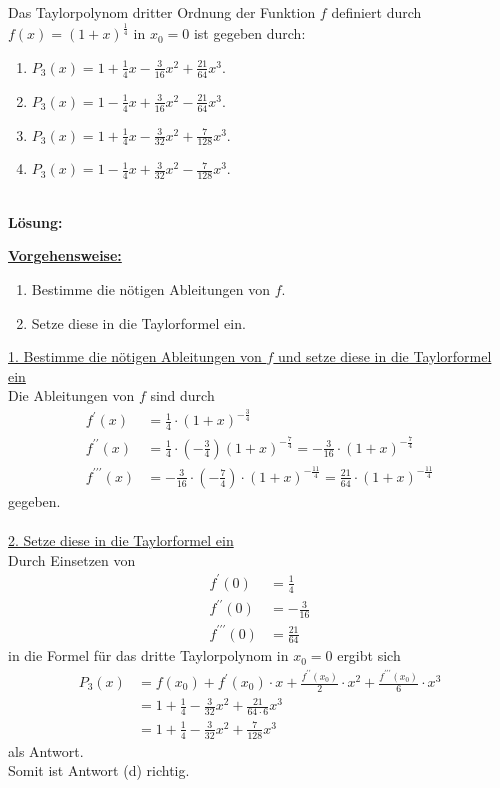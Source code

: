 \subsection*{}
Das Taylorpolynom dritter Ordnung der Funktion $f$ definiert durch 
$f(x) = (1+x)^{\frac{1}{4}}$ in $x_0 = 0$ ist gegeben durch:
\begin{enumerate}
\item $P_3(x) = 1 + \frac{1}{4} x - \frac{3}{16}x^2 +\frac{21}{64}x^3$.
\item $P_3(x) = 1 -\frac{1}{4} x + \frac{3}{16}x^2 - \frac{21}{64}x^3$.
\item $P_3(x) = 1 +\frac{1}{4} x - \frac{3}{32}x^2 + \frac{7}{128}x^3$.
\item $P_3(x) = 1 -\frac{1}{4} x + \frac{3}{32}x^2 - \frac{7}{128}x^3$.
\end{enumerate}
\ \\
\textbf{Lösung:}
\begin{mdframed}
\underline{\textbf{Vorgehensweise:}}
\renewcommand{\labelenumi}{\theenumi.}
\begin{enumerate}
\item Bestimme die nötigen Ableitungen von $f$.
\item Setze diese in die Taylorformel ein.
\end{enumerate}
\end{mdframed}

\underline{1. Bestimme die nötigen Ableitungen von $f$ und setze diese in die Taylorformel ein}\\
Die Ableitungen von $f$ sind durch
\begin{align*}
f^\prime(x) &= \frac{1}{4} \cdot (1 +x )^{-\frac{3}{4}}\\
f^{\prime \prime}(x) &=
\frac{1}{4} \cdot \left( - \frac{3}{4} \right) (1+x)^{-\frac{7}{4}} 
= - \frac{3}{16} \cdot (1+x)^{-\frac{7}{4}}\\
f^{\prime \prime \prime}(x) 
&= -\frac{3}{16} \cdot \left(- \frac{7}{4} \right)
\cdot (1+x)^{-\frac{11}{4}}
=\frac{21}{64} \cdot (1+x)^{-\frac{11}{4}}
\end{align*}
gegeben. 
\\
\\

\underline{2. Setze diese in die Taylorformel ein}\\	
Durch Einsetzen von 
\begin{align*}
f^\prime(0) &= \frac{1}{4}\\
f^{\prime \prime}(0) &= - \frac{3}{16}\\
f^{\prime \prime \prime}(0 ) &=\frac{21}{64}
\end{align*}
in die Formel für das dritte Taylorpolynom in $x_0 = 0$ ergibt sich
\begin{align*}
P_3(x) 
&= f(x_0) + f^\prime(x_0)\cdot x + \frac{f^{\prime \prime}(x_0)}{2}\cdot x^2+
\frac{f^{\prime \prime \prime}(x_0)}{6} \cdot x^3 \\
&=1 + \frac{1}{4} - \frac{3}{32} x^2+ \frac{21}{64 \cdot 6} x^3\\
&=1 + \frac{1}{4} - \frac{3}{32} x^2+ \frac{7}{128} x^3
\end{align*}
als Antwort.\\
Somit ist Antwort (d) richtig.

